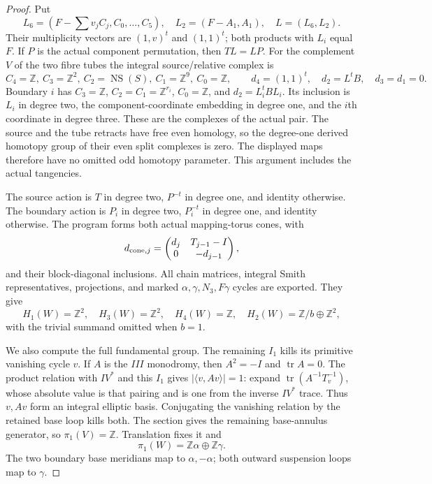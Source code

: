 \begin{proof}
Put
\[
 L_6=(F-\textstyle\sum v_jC_j,C_0,\ldots,C_5),\quad
 L_2=(F-A_1,A_1),\quad L=(L_6,L_2).
\]
Their multiplicity vectors are $(1,v)^t$ and $(1,1)^t$;
both products with $L_i$ equal $F$. If $P$ is the actual
component permutation, then $TL=LP$.
For the complement $V$ of the two fibre tubes the integral
source/relative complex is
\[
 C_4=\mathbb Z,\ C_3=\mathbb Z^2,\ C_2=\operatorname{NS}(S),
 \ C_1=\mathbb Z^9,\ C_0=\mathbb Z,\qquad
 d_4=(1,1)^t,\quad d_2=L^tB,\quad d_3=d_1=0.                  \tag{F46.13}
\]
Boundary $i$ has $C_3=\mathbb Z$, $C_2=C_1=\mathbb Z^{r_i}$,
$C_0=\mathbb Z$, and $d_2=L_i^tBL_i$.
Its inclusion is $L_i$ in degree two, the component-coordinate
embedding in degree one, and the $i$th coordinate in degree
three. These are the complexes of the actual pair. The source
and the tube retracts have free even homology, so the degree-one
derived homotopy group of their even split complexes is zero.
The displayed maps therefore have no omitted odd homotopy
parameter. This argument includes the actual tangencies.

The source action is $T$ in degree two, $P^{-t}$ in degree one,
and identity otherwise. The boundary action is $P_i$ in degree
two, $P_i^{-t}$ in degree one, and identity otherwise.
The program forms both actual mapping-torus cones, with
\[
       d_{{\rm cone},j}=
       \begin{pmatrix}d_j&T_{j-1}-I\\0&-d_{j-1}\end{pmatrix},
\]
and their block-diagonal inclusions. All chain matrices,
integral Smith representatives, projections, and marked
$\alpha,\gamma,N_3,F\gamma$ cycles are exported. They give
\[
 H_1(W)=\mathbb Z^2,\quad H_3(W)=\mathbb Z^2,\quad
 H_4(W)=\mathbb Z,\quad
 H_2(W)=\mathbb Z/b\oplus\mathbb Z^2,                           \tag{F46.14}
\]
with the trivial summand omitted when $b=1$.

We also compute the full fundamental group. The remaining
$I_1$ kills its primitive vanishing cycle $v$. If $A$ is the
$III$ monodromy, then $A^2=-I$ and $\operatorname{tr}A=0$.
The product relation with $IV^*$ and this $I_1$ gives
$|\langle v,Av\rangle|=1$: expand
$\operatorname{tr}(A^{-1}T_v^{-1})$, whose absolute value is
that pairing and is one from the inverse $IV^*$ trace.
Thus $v,Av$ form an integral elliptic basis. Conjugating the
vanishing relation by the retained base loop kills both.
The section gives the remaining base-annulus generator, so
$\pi_1(V)=\mathbb Z$. Translation fixes it and
\[
             \pi_1(W)=\mathbb Z\alpha\oplus\mathbb Z\gamma.
\]
The two boundary base meridians map to $\alpha,-\alpha$;
both outward suspension loops map to $\gamma$.


\end{proof}
